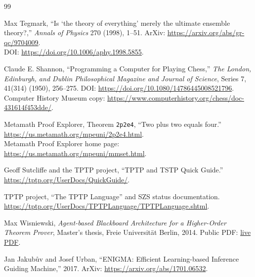 \documentclass[11pt,openany]{book}
\theoremstyle{definition}
\theoremstyle{remark}
\begin{document}
\backmatter
\renewcommand{\bibname}{References and live links}
\begin{thebibliography}{99}\raggedright
{}

Max Tegmark,
``Is `the theory of everything' merely the ultimate ensemble theory?,''
\emph{Annals of Physics} 270 (1998), 1--51.
ArXiv: \href{https://arxiv.org/abs/gr-qc/9704009}{https://arxiv.org/abs/gr-qc/9704009}.\\
DOI: \href{https://doi.org/10.1006/aphy.1998.5855}{https://doi.org/10.1006/aphy.1998.5855}.

Claude E. Shannon,
``Programming a Computer for Playing Chess,''
\emph{The London, Edinburgh, and Dublin Philosophical Magazine and Journal of Science}, Series 7, 41(314) (1950), 256--275.
DOI: \href{https://doi.org/10.1080/14786445008521796}{https://doi.org/10.1080/14786445008521796}.\\
Computer History Museum copy: \href{https://www.computerhistory.org/chess/doc-431614f453dde/}{https://www.computerhistory.org/chess/doc-431614f453dde/}.

Metamath Proof Explorer,
Theorem \texttt{2p2e4}, ``Two plus two equals four.''
\href{https://us.metamath.org/mpeuni/2p2e4.html}{https://us.metamath.org/mpeuni/2p2e4.html}.\\
Metamath Proof Explorer home page:
\href{https://us.metamath.org/mpeuni/mmset.html}{https://us.metamath.org/mpeuni/mmset.html}.

Geoff Sutcliffe and the TPTP project,
``TPTP and TSTP Quick Guide.''
\href{https://tptp.org/UserDocs/QuickGuide/}{https://tptp.org/UserDocs/QuickGuide/}.

TPTP project,
``The TPTP Language'' and SZS status documentation.
\href{https://tptp.org/UserDocs/TPTPLanguage/TPTPLanguage.shtml}{https://tptp.org/UserDocs/TPTPLanguage/TPTPLanguage.shtml}.

Max Wisniewski,
\emph{Agent-based Blackboard Architecture for a Higher-Order Theorem Prover}, Master's thesis, Freie Universit\"at Berlin, 2014.
Public PDF: \href{https://www.mi.fu-berlin.de/inf/groups/ag-ki/Theses/Completed-theses/Master_Diploma-theses/2014/Wisniewski/Master-Wisniewski1.pdf}{live PDF}.

Jan Jakub\r{u}v and Josef Urban,
``ENIGMA: Efficient Learning-based Inference Guiding Machine,'' 2017.
ArXiv: \href{https://arxiv.org/abs/1701.06532}{https://arxiv.org/abs/1701.06532}.


\end{thebibliography}
\end{document}
